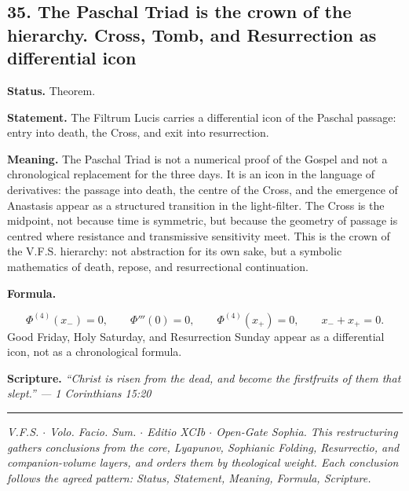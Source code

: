 \documentclass[11pt]{article}
\newcommand{\thesis}[2]{%
  \subsection*{#1. #2}%
}
\newcommand{\status}[1]{\textbf{Status.} #1\par}
\newcommand{\statement}[1]{\textbf{Statement.} #1\par}
\newcommand{\explain}[1]{\textbf{Meaning.} #1\par}
\newcommand{\formula}[1]{\textbf{Formula.}\par #1\par}
\newcommand{\scripture}[2]{\textbf{Scripture.} {\small\itshape ``#1'' --- #2}\par}
\begin{document}
\thesis{35}{The Paschal Triad is the crown of the hierarchy. Cross, Tomb, and Resurrection as differential icon}
\status{Theorem.}
\statement{The Filtrum Lucis carries a differential icon of the Paschal passage: entry into death, the Cross, and exit into resurrection.}
\explain{The Paschal Triad is not a numerical proof of the Gospel and not a chronological replacement for the three days. It is an icon in the language of derivatives: the passage into death, the centre of the Cross, and the emergence of Anastasis appear as a structured transition in the light-filter. The Cross is the midpoint, not because time is symmetric, but because the geometry of passage is centred where resistance and transmissive sensitivity meet. This is the crown of the V.F.S. hierarchy: not abstraction for its own sake, but a symbolic mathematics of death, repose, and resurrectional continuation.}
\formula{\[
  \Phi^{(4)}(x_-)=0,
  \qquad
  \Phi'''(0)=0,
  \qquad
  \Phi^{(4)}(x_+)=0,
  \qquad
  x_-+x_+=0.
\]
Good Friday, Holy Saturday, and Resurrection Sunday appear as a differential icon, not as a chronological formula.}
\scripture{Christ is risen from the dead, and become the firstfruits of them that slept.}{1 Corinthians 15:20}

\bigskip
\hrule
\smallskip
{\footnotesize\emph{V.F.S. $\cdot$ Volo. Facio. Sum. $\cdot$ Editio XCIb $\cdot$ Open-Gate Sophia. This restructuring gathers conclusions from the core, Lyapunov, Sophianic Folding, Resurrectio, and companion-volume layers, and orders them by theological weight. Each conclusion follows the agreed pattern: Status, Statement, Meaning, Formula, Scripture.}}
\end{document}
